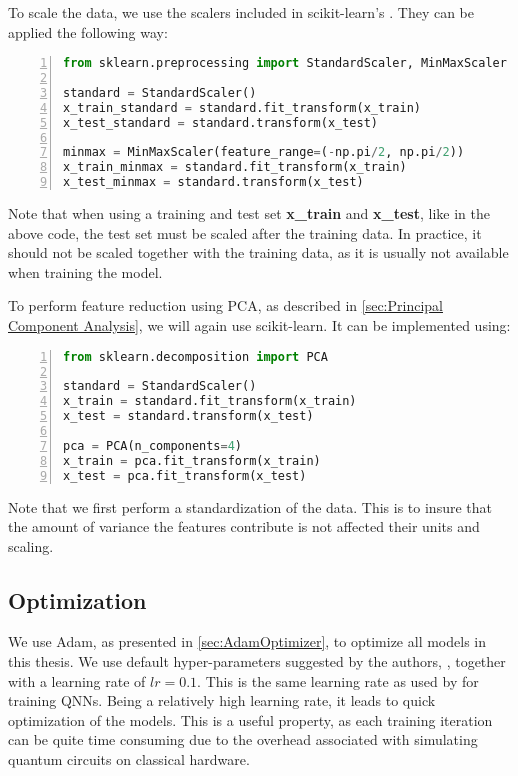 To scale the data, we use the scalers included in scikit-learn's \cite{scikit-learn}. They can be applied the following way:
\begin{lstlisting}[language=python, numbers=left]
from sklearn.preprocessing import StandardScaler, MinMaxScaler

standard = StandardScaler()
x_train_standard = standard.fit_transform(x_train)
x_test_standard = standard.transform(x_test)

minmax = MinMaxScaler(feature_range=(-np.pi/2, np.pi/2))
x_train_minmax = standard.fit_transform(x_train)
x_test_minmax = standard.transform(x_test)
\end{lstlisting}
Note that when using a training and test set \textbf{x\_train} and \textbf{x\_test}, like in the above code, the test set must be scaled after the training data. In practice, it should not be scaled together with the training data, as it is usually not available when training the model.

To perform feature reduction using PCA, as described in \autoref{sec:Principal Component Analysis}, we will again use scikit-learn. It can be implemented using:

\begin{lstlisting}[language=python, numbers=left]
from sklearn.decomposition import PCA

standard = StandardScaler()
x_train = standard.fit_transform(x_train)
x_test = standard.transform(x_test)

pca = PCA(n_components=4)
x_train = pca.fit_transform(x_train)
x_test = pca.fit_transform(x_test)
\end{lstlisting}
Note that we first perform a standardization of the data. This is to insure that the amount of variance the features contribute is not affected their units and scaling.


\subsection{Optimization}\label{sec:Optimization}
We use Adam, as presented in \autoref{sec:AdamOptimizer}, to optimize all models in this thesis. We use default hyper-parameters suggested by the authors, \citet{kingma2017adam}, together with a learning rate of $lr=0.1$. This is the same learning rate as used by \citet{abbas2020power} for training QNNs. Being a relatively high learning rate, it leads to quick optimization of the models. This is a useful property, as each training iteration can be quite time consuming due to the overhead associated with simulating quantum circuits on classical hardware.

